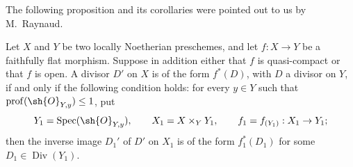 
The following proposition and its corollaries were pointed out to us by
M.~Raynaud.

\begin{proposition}[21.4.9]
\ifdefined\EGAIVSuppressErratumLabels\else\label{IV.21.4.9}\fi
Let $X$ and $Y$ be two locally Noetherian preschemes, and let
$f:X\to Y$ be a faithfully flat morphism.  Suppose in addition either
that $f$ is quasi-compact or that $f$ is open.  A divisor $D'$ on $X$
is of the form $f^*(D)$, with $D$ a divisor on $Y$, if and only if the
following condition holds: for every $y\in Y$ such that
$\operatorname{prof}(\sh{O}_{Y,y})\leq 1$, put
\[
 Y_1=\operatorname{Spec}(\sh{O}_{Y,y}),\qquad
 X_1=X\times_Y Y_1,
 \qquad f_1=f_{(Y_1)}:X_1\to Y_1;
\]
then the inverse image $D_1'$ of $D'$ on $X_1$ is of the form
$f_1^*(D_1)$ for some $D_1\in\operatorname{Div}(Y_1)$.
\end{proposition}

